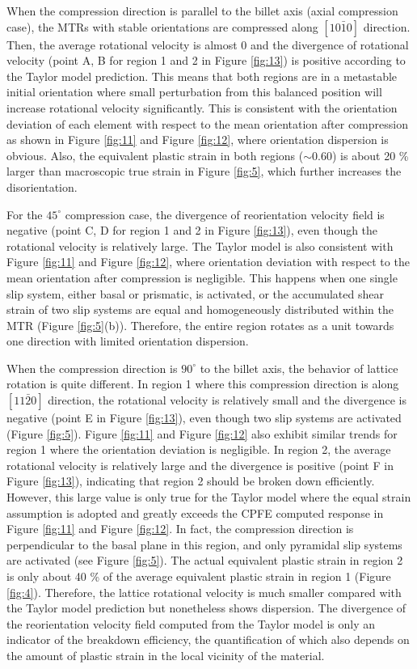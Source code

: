\documentclass[review]{elsarticle}
\begin{document}
When the compression direction is parallel to the billet axis (axial compression case), the MTRs with stable orientations are compressed along $[10\bar{1}0]$ direction.
Then, the average rotational velocity is almost 0 and the divergence of rotational velocity (point A, B for region 1 and 2 in Figure \ref{fig:13}) is positive according to the Taylor model prediction.
This means that both regions are in a metastable initial orientation where small perturbation from this balanced position will increase rotational velocity significantly.
This is consistent with the orientation deviation of each element with respect to the mean orientation after compression as shown in Figure \ref{fig:11} and Figure \ref{fig:12}, where orientation dispersion is obvious.
Also, the equivalent plastic strain in both regions ($\sim 0.60$) is about 20 \% larger than macroscopic true strain in Figure \ref{fig:5}, which further increases the disorientation.

For the $45^{\circ}$ compression case, the divergence of reorientation velocity field is negative (point C, D for region 1 and 2 in Figure \ref{fig:13}), even though the rotational velocity is relatively large.
The Taylor model is also consistent with Figure \ref{fig:11} and Figure \ref{fig:12}, where orientation deviation with respect to the mean orientation after compression is negligible.
This happens when one single slip system, either basal or prismatic, is activated, or the accumulated shear strain of two slip systems are equal and homogeneously distributed within the MTR (Figure \ref{fig:5}(b)).
Therefore, the entire region rotates as a unit towards one direction with limited orientation dispersion.

When the compression direction is $90^{\circ}$ to the billet axis, the behavior of lattice rotation is quite different.
In region 1 where this compression direction is along $[11\bar{2}0]$ direction, the rotational velocity is relatively small and the divergence is negative (point E in Figure \ref{fig:13}), even though two slip systems are activated (Figure \ref{fig:5}).
Figure \ref{fig:11} and Figure \ref{fig:12} also exhibit similar trends for region 1 where the orientation deviation is negligible.
In region 2, the average rotational velocity is relatively large and the divergence is positive (point F in Figure \ref{fig:13}), indicating that region 2 should be broken down efficiently.
However, this large value is only true for the Taylor model where the equal strain assumption is adopted and greatly exceeds the CPFE computed response in Figure \ref{fig:11} and Figure \ref{fig:12}.
In fact, the compression direction is perpendicular to the basal plane in this region, and only pyramidal slip systems are activated (see Figure \ref{fig:5}).
The actual equivalent plastic strain in region 2 is only about 40 \% of the average equivalent plastic strain in region 1 (Figure \ref{fig:4}).
Therefore, the lattice rotational velocity is much smaller compared with the Taylor model prediction but nonetheless shows dispersion.
The divergence of the reorientation velocity field computed from the Taylor model is only an indicator of the breakdown efficiency, the quantification of which also depends on the amount of plastic strain in the local vicinity of the material.
\end{document}

